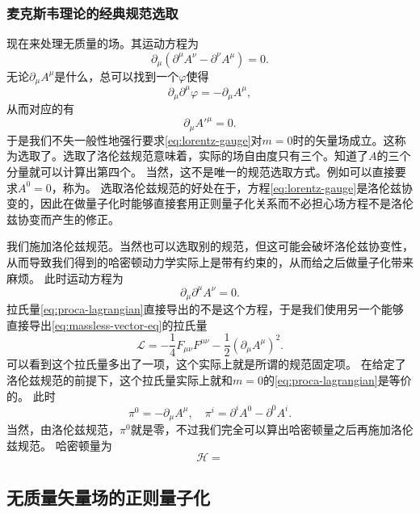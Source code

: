 \subsubsection{麦克斯韦理论的经典规范选取}

现在来处理无质量的场。其运动方程为
\[
    \partial_\mu (\partial^\mu A^\nu - \partial^\nu A^\mu) = 0.
\]
无论$\partial_\mu A^\mu$是什么，总可以找到一个$\varphi$使得
\[
    \partial_\mu \partial^\mu \varphi = - \partial_\mu A^\mu,
\]
从而对应的有
\[
    \partial_\mu {A'}^\mu = 0.
\]
于是我们不失一般性地强行要求\eqref{eq:lorentz-gauge}对$m=0$时的矢量场成立。这称为选取了。选取了洛伦兹规范意味着，实际的场自由度只有三个。知道了$A$的三个分量就可以计算出第四个。
当然，这不是唯一的规范选取方式。例如可以直接要求$A^0 = 0$，称为。
选取洛伦兹规范的好处在于，方程\eqref{eq:lorentz-gauge}是洛伦兹协变的，因此在做量子化时能够直接套用正则量子化关系而不必担心场方程不是洛伦兹协变而产生的修正。

我们施加洛伦兹规范。当然也可以选取别的规范，但这可能会破坏洛伦兹协变性，从而导致我们得到的哈密顿动力学实际上是带有约束的，从而给之后做量子化带来麻烦。
此时运动方程为
\begin{equation}
    \partial_\mu \partial^\mu A^\nu = 0.
    \label{eq:massless-vector-eq}
\end{equation}
拉氏量\eqref{eq:proca-lagrangian}直接导出的不是这个方程，于是我们使用另一个能够直接导出\eqref{eq:massless-vector-eq}的拉氏量
\begin{equation}
    \mathcal{L} = - \frac{1}{4} F_{\mu \nu} F^{\mu \nu} - \frac{1}{2} (\partial_\mu A^\mu)^2.
    \label{eq:maxwell-lagrangian-fixed}
\end{equation}
可以看到这个拉氏量多出了一项，这个实际上就是所谓的规范固定项。
在给定了洛伦兹规范的前提下，这个拉氏量实际上就和$m=0$的\eqref{eq:proca-lagrangian}是等价的。
此时
\begin{equation}
    \pi^0 = -\partial_\mu A^\mu, \quad \pi^i = \partial^i A^0 - \partial^0 A^i.
\end{equation}
当然，由洛伦兹规范，$\pi^0$就是零，不过我们完全可以算出哈密顿量之后再施加洛伦兹规范。
哈密顿量为 %
\begin{equation}
    \mathcal{H} = 
\end{equation}

\subsection{无质量矢量场的正则量子化}

